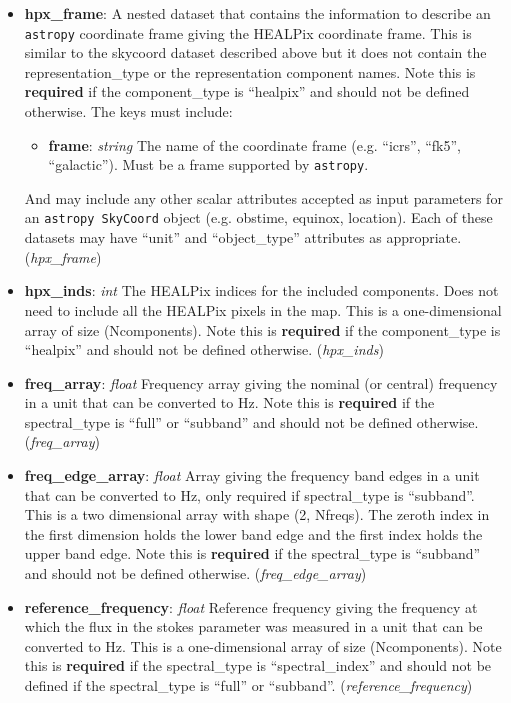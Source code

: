 \documentclass[11pt, oneside]{article}
\begin{document}
\begin{itemize}
\item \textbf{hpx\_frame}:  A nested dataset that contains the information to describe an \texttt{astropy} coordinate frame giving the HEALPix coordinate frame.
This is similar to the skycoord dataset described above but it does not contain the representation\_type or the representation component names.
Note this is \textbf{required} if the component\_type is ``healpix'' and should not be defined otherwise.
The keys must include:
	\begin{itemize}
	\item \textbf{frame}: \textit{string} The name of the coordinate frame (e.g. ``icrs'', ``fk5'', ``galactic''). Must be a frame supported by \texttt{astropy}.
	\end{itemize}
And may include any other scalar attributes accepted as input parameters for an \texttt{astropy SkyCoord} object (e.g. obstime, equinox, location).
Each of these datasets may have ``unit'' and ``object\_type'' attributes as appropriate.
(\textit{hpx\_frame})

\item \textbf{hpx\_inds}: \textit{int}
The HEALPix indices for the included components. Does not need to include all the HEALPix pixels in the map.
This is a one-dimensional array of size (Ncomponents).
Note this is \textbf{required} if the component\_type is ``healpix'' and should not be defined otherwise. (\textit{hpx\_inds})

\item \textbf{freq\_array}: \textit{float}
Frequency array giving the nominal (or central) frequency in a unit that can be converted to Hz.
Note this is \textbf{required} if the spectral\_type is ``full'' or ``subband'' and should not be defined otherwise. (\textit{freq\_array})

\item \textbf{freq\_edge\_array}: \textit{float}
Array giving the frequency band edges in a unit that can be converted to Hz, only required if spectral\_type is ``subband''.
This is a two dimensional array with shape (2, Nfreqs). The zeroth index in the first dimension holds the lower band edge
and the first index holds the upper band edge.
Note this is \textbf{required} if the spectral\_type is ``subband'' and should not be defined otherwise. (\textit{freq\_edge\_array})

\item \textbf{reference\_frequency}: \textit{float}
Reference frequency giving the frequency at which the flux in the stokes parameter was measured in a unit that can be converted to Hz.
This is a one-dimensional array of size (Ncomponents).
Note this is \textbf{required} if the spectral\_type is ``spectral\_index'' and should not be defined if the spectral\_type is ``full'' or ``subband''.
(\textit{reference\_frequency})


\end{itemize}
\end{document}
